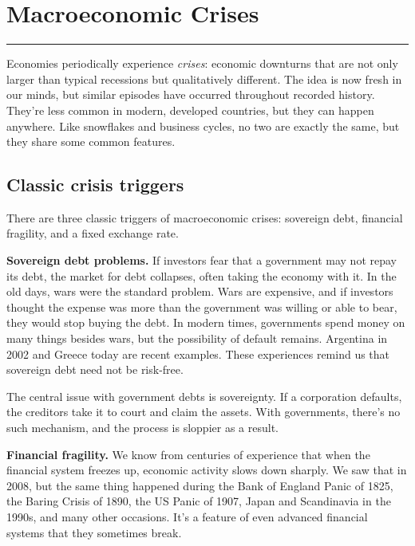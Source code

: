 \chapter{Macroeconomic Crises}\label{chp:cris}
\hypertarget{crises}{}


\rule{\textwidth}{1pt}

Economies periodically experience {\it crises\/}:
economic downturns that are not only larger than typical recessions
but qualitatively different.
The idea is now fresh in our minds,
but similar episodes have occurred throughout recorded history.
They're less common in modern, developed countries,
but they can happen anywhere.
Like snowflakes and business cycles, no two are exactly the same,
but they share some common features.


\section{Classic crisis triggers }

There are three classic triggers of macroeconomic crises:
sovereign debt, financial fragility, and a fixed exchange rate.

\textbf{Sovereign debt problems.}
If investors fear that a government may not repay its debt,
the market for debt collapses, often taking the economy with it.
In the old days, wars were the standard problem.
Wars are expensive, and if investors thought the expense was more
than the government was willing or able to bear,
they would stop buying the debt.
In modern times, governments spend money on many things besides wars,
but the possibility of default remains.
Argentina in 2002 and Greece today are recent examples.
These experiences remind us that sovereign debt need not be risk-free.

The central issue with government debts is sovereignty.
If a corporation defaults, the creditors take it to court
and claim the assets.
With governments, there's no such mechanism, and the process
is sloppier as a result.

\textbf{Financial fragility.}
We know from centuries of experience that when the
financial system freezes up,
economic activity slows down sharply.
We saw that in 2008,
but the same thing happened during the Bank of England Panic of 1825,
the Baring Crisis of 1890,
the US Panic of 1907,
Japan and Scandinavia in the 1990s,
and many other occasions.
It's a feature of even advanced financial systems that they
sometimes break.

